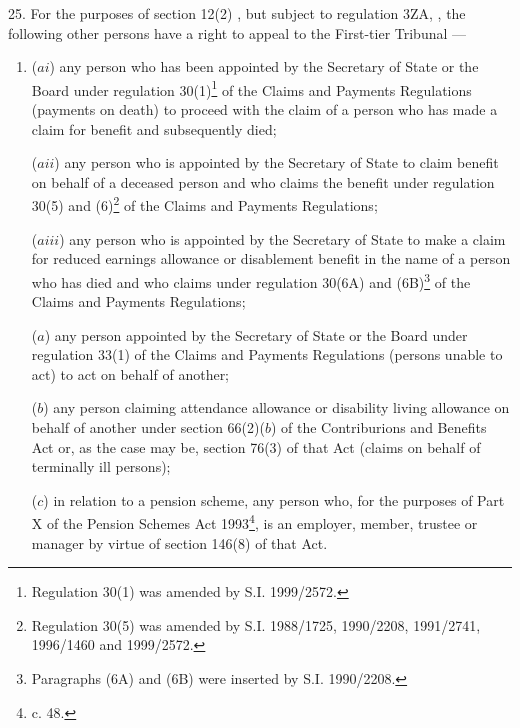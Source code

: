\documentclass[12pt,a4paper]{article}
\begin{document}
25.  For the purposes of 
section 12(2)%
, but subject to regulation 3ZA,%
, the following other persons have a right to appeal to 
the First-tier Tribunal%
—
\begin{enumerate}\item[]
($ai$) any person who has been appointed by the Secretary of State or the Board under regulation 30(1)\footnote{Regulation 30(1) was amended by S.I. 1999/2572.} of the Claims and Payments Regulations (payments on death) to proceed with the claim of a person who has made a claim for benefit and subsequently died;

($aii$) any person who is appointed by the Secretary of State to claim benefit on behalf of a deceased person and who claims the benefit under regulation 30(5) and (6)\footnote{Regulation 30(5) was amended by S.I. 1988/1725, 1990/2208, 1991/2741, 1996/1460 and 1999/2572.} of the Claims and Payments Regulations;

($aiii$) any person who is appointed by the Secretary of State to make a claim for reduced earnings allowance or disablement benefit in the name of a person who has died and who claims under regulation 30(6A) and (6B)\footnote{Paragraphs (6A) and (6B) were inserted by S.I. 1990/2208.} of the Claims and Payments Regulations;

($a$) any person appointed by the Secretary of State 
or the Board  %
under regulation 33(1) of the Claims and Payments Regulations (persons unable to act) to act on behalf of another;

($b$) any person claiming attendance allowance or disability living allowance on behalf of another under section 66(2)($b$) of the Contriburions and Benefits Act or, as the case may be, section 76(3) of that Act (claims on behalf of terminally ill persons);

($c$) in relation to a pension scheme, any person who, for the purposes of Part X of the Pension Schemes Act 1993\footnote{ c. 48.}, is an employer, member, trustee or manager by virtue of section 146(8) of that Act.
\end{enumerate}
\end{document}
